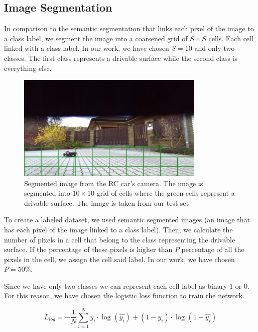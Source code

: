 \documentclass{ctuthesis/ctuthesis}
\begin{document}
\subsection{Image Segmentation}\label{s:Image_Segmentation}
In comparison to the semantic segmentation that links each pixel of the image to a class label, we segment the image into a coarsened grid of $S\times S$ cells. Each cell linked with a class label. In our work, we have chosen $S=10$ and only two classes. The first class represents a drivable surface while the second class is everything else. \par


\begin{figure}[h!]
    \centering
    \includegraphics[width=0.8\textwidth]{images/segmented_image.png}
    
    \caption{Segmented image from the RC car's camera. The image is segmented into $10\times 10$ grid of cells where the green cells represent a drivable surface. The image is taken from our test set}\label{f:segmented_image}
\end{figure}

To create a labeled dataset, we used semantic segmented images (an image that has each pixel of the image linked to a class label). Then, we calculate the number of pixels in a cell that belong to the class representing the drivable surface. If the percentage of these pixels is higher than $P$ percentage of all the pixels in the cell, we assign the cell said label. In our work, we have chosen $P=50\%$.\par


Since we have only two classes we can represent each cell label as binary 1 or 0. For this reason, we have chosen the logistic loss function to train the network. \par

\begin{equation}
L_{log} = -\dfrac{1}{N} \sum_{i=1}^{N} y_i \cdot \log_{} (\hat{y_i}) + (1 - y_i) \cdot \log_{} (1-\hat{y_i})
\end{equation}
\end{document}
